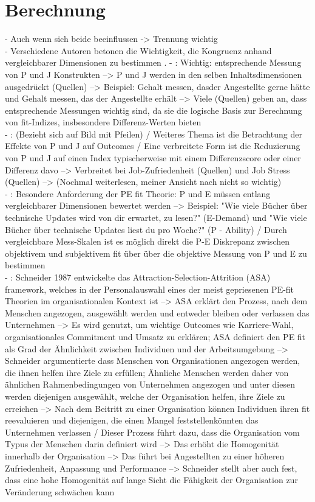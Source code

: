 \section{Berechnung}
\label{ch:personEnvironmentFit:berechnung}
- Auch wenn sich beide beeinflussen -> Trennung wichtig\\
- Verschiedene Autoren betonen die Wichtigkeit, die Kongruenz anhand vergleichbarer Dimensionen zu bestimmen \cite[S. 5]{caplan:1987}\cite{copingAndAdaption:1974}.
- \cite[S. 4]{edwards:1991}: Wichtig: entsprechende Messung von P und J Konstrukten --> P und J werden in den selben Inhaltsdimensionen ausgedrückt (Quellen) --> Beispiel: Gehalt messen, dasder Angestellte gerne hätte und Gehalt messen, das der Angestellte erhält --> Viele (Quellen) geben an, dass entsprechende Messungen wichtig sind, da sie die logische Basis zur Berechnung von fit-Indizes, insbesondere Differenz-Werten bieten \\
- \cite[S. 4]{edwards:1991}: (Bezieht sich auf Bild mit Pfeilen) / Weiteres Thema ist die Betrachtung der Effekte von P und J auf Outcomes / Eine verbreitete Form ist die Reduzierung von P und J auf einen Index typischerweise mit einem Differenzscore oder einer Differenz davo --> Verbreitet bei Job-Zufriedenheit (Quellen) und Job Stress (Quellen) --> (Nochmal weiterlesen, meiner Ansicht nach nicht so wichtig) \\
- \cite[S. 5]{caplan:1987}: Besondere Anforderung der PE fit Theorie: P und E müssen entlang vergleichbarer Dimensionen bewertet werden --> Beispiel: "Wie viele Bücher über technische Updates wird von dir erwartet, zu lesen?" (E-Demand) und "Wie viele Bücher über technische Updates liest du pro Woche?" (P - Ability) / Durch vergleichbare Mess-Skalen ist es möglich direkt die P-E Diskrepanz zwischen objektivem und subjektivem fit über über die objektive Messung von P und E zu bestimmen \\
- \cite[S. 4]{su:2015}: Schneider 1987 entwickelte das Attraction-Selection-Attrition (ASA) framework, welches in der Personalauswahl eines der meist gepriesenen PE-fit Theorien im organisationalen Kontext ist --> ASA erklärt den Prozess, nach dem Menschen angezogen, ausgewählt werden und entweder bleiben oder verlassen das Unternehmen --> Es wird genutzt, um wichtige Outcomes wie Karriere-Wahl, organisationales Commitment und Umsatz zu erklären; ASA definiert den PE fit als Grad der Ähnlichkeit zwischen Individuen und der Arbeitsumgebung --> Schneider argumentierte dass Menschen von Organisationen angezogen werden, die ihnen helfen ihre Ziele zu erfüllen; Ähnliche Menschen werden daher von ähnlichen Rahmenbedingungen von Unternehmen angezogen und unter diesen werden diejenigen ausgewählt, welche der Organisation helfen, ihre Ziele zu erreichen --> Nach dem Beitritt zu einer Organisation können Individuen ihren fit reevaluieren und diejenigen, die einen Mangel feststellenkönnten das Unternehmen verlassen / Dieser Prozess führt dazu, dass die Organisation vom Typus der Menschen darin definiert wird --> Das erhöht die Homogenität innerhalb der Organisation --> Das führt bei Angestellten zu einer höheren Zufriedenheit, Anpassung und Performance --> Schneider stellt aber auch fest, dass eine hohe Homogenität auf lange Sicht die Fähigkeit der Organisation zur Veränderung schwächen kann \\
